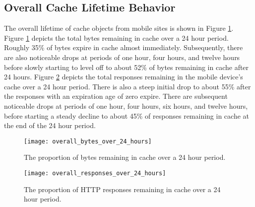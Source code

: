 \subsection*{Overall Cache Lifetime Behavior}

The overall lifetime of cache objects from mobile sites is shown in Figure \ref{fig:overall_bytes_over_24_hours}. Figure \ref{fig:overall_bytes_over_24_hours} depicts the total bytes remaining in cache over a 24 hour period. Roughly 35\% of bytes expire in cache almost immediately. Subsequently, there are also noticeable drops at periods of one hour, four hours, and twelve hours before slowly starting to level off to about 52\% of bytes remaining in cache after 24 hours. Figure \ref{fig:overall_responses_over_24_hours} depicts the total responses remaining in the mobile device’s cache over a 24 hour period. There is also a steep initial drop to about 55\% after the responses with an expiration age of zero expire. There are subsequent noticeable drops at periods of one hour, four hours, six hours, and twelve hours, before starting a steady decline to about 45\% of responses remaining in cache at the end of the 24 hour period.

\begin{figure}[]
	\centering
	\texttt{[image: overall\_bytes\_over\_24\_hours]}
	\caption{The proportion of bytes remaining in cache over a 24 hour period.}
	\label{fig:overall_bytes_over_24_hours}
\end{figure}

\begin{figure}[]
	\centering
	\texttt{[image: overall\_responses\_over\_24\_hours]}
	\caption{The proportion of HTTP responses remaining in cache over a 24 hour period.}
	\label{fig:overall_responses_over_24_hours}
\end{figure}

